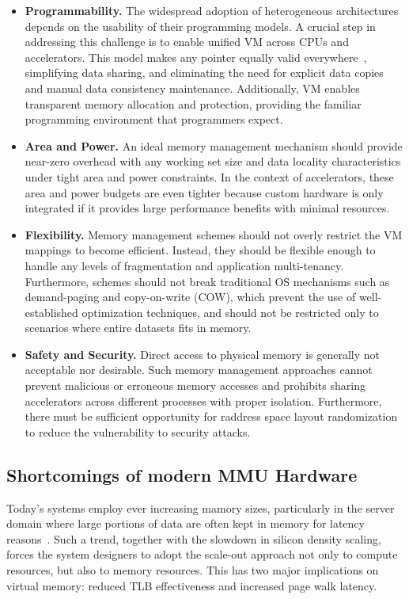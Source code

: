 \begin{itemize}
        \item \textbf{Programmability.} The widespread adoption of heterogeneous architectures depends on the usability of their programming models. A crucial step in addressing this challenge is to enable unified VM across CPUs and accelerators. This model makes any pointer equally valid everywhere~\cite{hsa}, simplifying data sharing, and eliminating the need for explicit data copies and manual data consistency maintenance. Additionally, VM enables transparent memory allocation and protection, providing the familiar programming environment that programmers expect.
        \item \textbf{Area and Power.} An ideal memory management mechanism should provide near-zero overhead with any working set size and data locality characteristics under tight area and power constraints. In the context of accelerators, these area and power budgets are even tighter because custom hardware is only integrated if it provides large performance benefits with minimal resources.
        \item \textbf{Flexibility.} Memory management schemes should not overly restrict the VM mappings to become efficient. Instead, they should be flexible enough to handle any levels of fragmentation and application multi-tenancy. Furthermore, schemes should not break traditional OS mechanisms such as demand-paging and copy-on-write (COW), which prevent the use of well-established optimization techniques, and should not be restricted only to scenarios where entire datasets fits in memory.

        \item \textbf{Safety and Security.} Direct access to physical memory is generally not acceptable nor desirable. Such memory management approaches cannot prevent malicious or erroneous memory accesses and prohibits sharing accelerators across different processes with proper isolation. Furthermore, there must be sufficient opportunity for raddress space layout randomization to reduce the vulnerability to security attacks.
\end{itemize}


\subsection{Shortcomings of modern MMU Hardware}

Today's systems employ ever increasing mamory sizes, particularly in the server domain where large portions of data are often kept in memory for latency reasons~\cite{}. Such a trend, together with the slowdown in silicon density scaling, forces the system designers to adopt the scale-out approach not only to compute resources, but also to memory resources. This has two major implications on virtual memory: reduced TLB effectiveness and increased page walk latency. 

